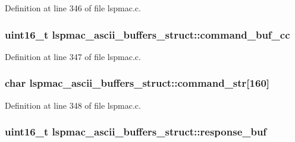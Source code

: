 Definition at line 346 of file lspmac.\-c.

\hypertarget{structlspmac__ascii__buffers__struct_a4d11efeb1eef407d811d3f9b774adc54}{
\subsubsection[{command\-\_\-buf\-\_\-cc}]{\setlength{\rightskip}{0pt plus 5cm}uint16\-\_\-t lspmac\-\_\-ascii\-\_\-buffers\-\_\-struct\-::command\-\_\-buf\-\_\-cc}}\label{structlspmac__ascii__buffers__struct_a4d11efeb1eef407d811d3f9b774adc54}


Definition at line 347 of file lspmac.\-c.

\hypertarget{structlspmac__ascii__buffers__struct_abe6a433dd9be4781dbf7e31d16484a4b}{
\subsubsection[{command\-\_\-str}]{\setlength{\rightskip}{0pt plus 5cm}char lspmac\-\_\-ascii\-\_\-buffers\-\_\-struct\-::command\-\_\-str\mbox{[}160\mbox{]}}}\label{structlspmac__ascii__buffers__struct_abe6a433dd9be4781dbf7e31d16484a4b}


Definition at line 348 of file lspmac.\-c.

\hypertarget{structlspmac__ascii__buffers__struct_ae1d37cf9568478c9d8dad540ce77183c}{
\subsubsection[{response\-\_\-buf}]{\setlength{\rightskip}{0pt plus 5cm}uint16\-\_\-t lspmac\-\_\-ascii\-\_\-buffers\-\_\-struct\-::response\-\_\-buf}}\label{structlspmac__ascii__buffers__struct_ae1d37cf9568478c9d8dad540ce77183c}


